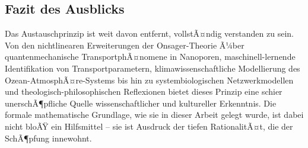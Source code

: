 ﻿\documentclass[a4paper,12pt]{article}
\theoremstyle{definition}
\begin{document}
\subsection{Fazit des Ausblicks}

Das Austauschprinzip ist weit davon entfernt, vollstÃ¤ndig verstanden zu sein.
Von den nichtlinearen Erweiterungen der Onsager-Theorie Ã¼ber quantenmechanische
TransportphÃ¤nomene in Nanoporen, maschinell-lernende Identifikation von
Transportparametern, klimawissenschaftliche Modellierung des Ozean-AtmosphÃ¤re-Systems
bis hin zu systembiologischen Netzwerkmodellen und theologisch-philosophischen
Reflexionen bietet dieses Prinzip eine schier unerschÃ¶pfliche Quelle wissenschaftlicher
und kultureller Erkenntnis. Die formale mathematische Grundlage, wie sie in dieser
Arbeit gelegt wurde, ist dabei nicht bloÃŸ ein Hilfsmittel -- sie ist Ausdruck
der tiefen RationalitÃ¤t, die der SchÃ¶pfung innewohnt.
\end{document}
